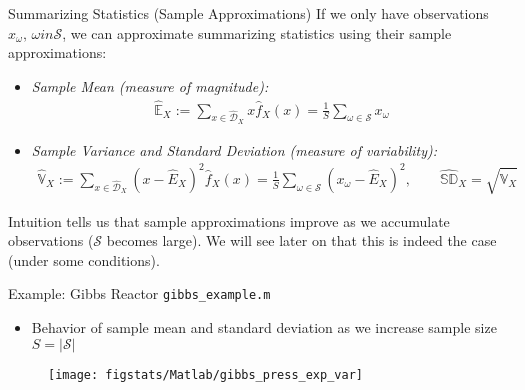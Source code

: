 \documentclass[9pt]{beamer}
\begin{document}
%
\begin{frame}{Summarizing Statistics (Sample Approximations)}
If we only have observations $x_\omega,\,\omega in \mathcal{S}$, we can approximate summarizing statistics using their sample approximations: 
\begin{block}{}
\begin{itemize}
\item {\em Sample Mean (measure of magnitude):} 
\begin{align*}
\hat{\mathbb{E}}_X:=\sum_{x\in \hat{\mathcal{D}}_X}x\hat{f}_X(x)=\frac{1}{S}\sum_{\omega\in \mathcal{S}}x_\omega
\end{align*}
\item {\em Sample Variance and Standard Deviation (measure of variability):} 
\begin{align*}
\hat{\mathbb{V}}_X:=\sum_{x\in \hat{\mathcal{D}}_X}(x-\hat{E}_X)^2\hat{f}_X(x)=\frac{1}{S}\sum_{\omega\in \mathcal{S}}(x_\omega-\hat{E}_X)^2,\qquad \hat{\mathbb{SD}}_X=\sqrt{\hat{\mathbb{V}}_X}
\end{align*}
\end{itemize}
\end{block}
Intuition tells us that sample approximations improve as we accumulate observations ($\mathcal{S}$ becomes large). We will see later on that this is indeed the case (under some conditions). 
\end{frame}

\begin{frame}{Example: Gibbs Reactor \footnotesize{\texttt{gibbs\_example.m}}}
\begin{itemize}
\item Behavior of sample mean and standard deviation as we increase sample size $S=|\mathcal{S}|$
\end{itemize}
\begin{figure}[!htb]
    \centering
	\texttt{[image: figstats/Matlab/gibbs\_press\_exp\_var]}
\end{figure}

\end{frame}
\end{document}
